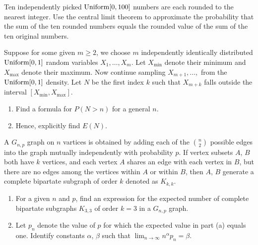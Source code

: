 \begin{problem}
  Ten independently picked \(\operatorname{Uniform}[0,100]\) numbers are each rounded to
  the nearest integer. Use the central limit theorem to approximate the
  probability that the sum of the ten rounded numbers equals the rounded
  value of the sum of the ten original numbers.
\end{problem}
\begin{solution*}
\end{solution*}

\begin{problem}
  Suppose for some given \(m\geq 2\), we choose \(m\) independently
  identically distributed \(\operatorname{Uniform}[0,1]\) random variables
  \(X_1,\dotsc,X_m\). Let \(X_{\text{min}}\) denote their minimum and
  \(X_{\text{max}}\) denote their maximum. Now continue sampling
  \(X_{m+1},\dotsc,\) from the \(\operatorname{Uniform}[0,1]\) density. Let \(N\) be the
  first index \(k\) such that \(X_{m+k}\) falls outside the interval
  \([X_{\text{min}},X_{\text{max}}]\).
  \begin{enumerate}[label=(\alph*),noitemsep]
  \item Find a formula for \(P(N>n)\) for a general \(n\).
  \item Hence, explicitly find \(E(N)\).
  \end{enumerate}
\end{problem}
\begin{solution*}
\end{solution*}

\begin{problem}
  A \(G_{n,p}\) graph on \(n\) vartices is obtained by adding each of the
  \(\binom{n}{2}\) possible edges into the graph mutually independently
  with probability \(p\). If vertex subsets \(A\), \(B\) both have \(k\)
  vertices, and each vertex \(A\) shares an edge with each vertex in \(B\),
  but there are no edges among the vertices within \(A\) or within \(B\),
  then \(A\), \(B\) generate a complete bipartate subgraph of order \(k\)
  denoted as \(K_{k,k}\).
  \begin{enumerate}[label=(\alph*),noitemsep]
  \item For a given \(n\) and \(p\), find an expression for the
    expected number of complete bipartate subgraphs \(K_{3,3}\) of order
    \(k=3\) in a \(G_{n,p}\) graph.
  \item Let \(p_n\) denote the value of \(p\) for which the expected
    value in part (a) equals one. Identify constants \(\alpha\), \(\beta\)
    such that \(\lim_{n\to\infty}n^\alpha p_n=\beta\).
  \end{enumerate}
\end{problem}
\begin{solution*}
\end{solution*}

